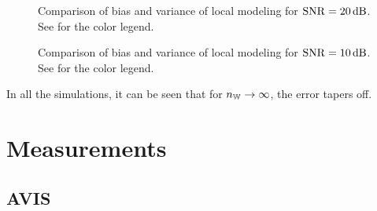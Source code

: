 \begin{figure}[p]
  \centering
  \setlength{\figurewidth}{0.85\columnwidth}
  \setlength{\figureheight}{0.62\figurewidth}
  
  \caption[Comparison of local models for $\SNR = 20 \unit{dB}$]{Comparison of bias and variance of local modeling for $\SNR=20\unit{dB}$. See  for the color legend.}
  \label{fig:nparam:comparison:lowSNR}
\end{figure}

\begin{figure}[p]
  \centering
  \setlength{\figurewidth}{0.85\columnwidth}
  \setlength{\figureheight}{0.62\figurewidth}
  
 \caption[Comparison of local models for $\SNR = 10 \unit{dB}$]{Comparison of bias and variance of local modeling for $\SNR=10\unit{dB}$. See  for the color legend.}
  \label{fig:nparam:comparison:terribleSNR}
\end{figure}

\begin{guideline}
\end{guideline}

\begin{guideline}
\end{guideline}

\begin{guideline}
\end{guideline}

\begin{remark}
In all the simulations, it can be seen that for $n_{\mathbb{W}} \to \infty$, the error tapers off.
\end{remark}

  \section{Measurements}
  \label{sec:measurements}
   \subsection{AVIS}

